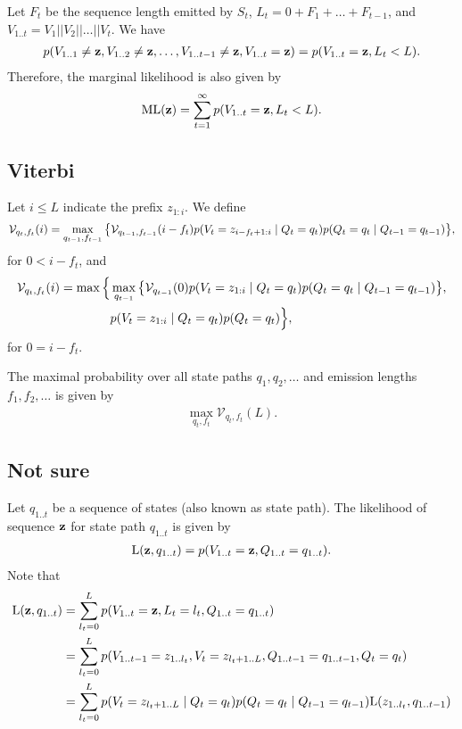 Let $F_t$ be the sequence length emitted by $S_t$, $L_t = 0+F_1+\dots+F_{t-1}$,
and $V_{1..t} = V_1||V_2||\dots||V_t$.
We have
\begin{align*}
  p(V_{1..1} \neq \mathbf{z}, V_{1..2} \neq \mathbf{z}, \dots, V_{1..{t-1}} \neq \mathbf{z}, V_{1..t}=\mathbf{z})
  = p(V_{1..t}=\mathbf{z}, L_t<L).
\end{align*}
Therefore, the marginal likelihood is also given by
\begin{align*}
  \mathrm{ML}(\mathbf{z}) = \sum_{t=1}^{\infty} p(V_{1..t}=\mathbf{z}, L_t<L).
\end{align*}

\subsection{Viterbi}

Let $i \leq L$ indicate the prefix $z_{1:i}$.
We define
\begin{align*}
  \mathcal{V}_{q_t,f_t}(i) =
  \max_{q_{t-1}, f_{t-1}}
  \big\{
    \mathcal{V}_{q_{t-1},f_{t-1}}(i-f_t) p(V_t=z_{i-f_t+1:i} \;|\; Q_t=q_t) p(Q_t=q_t \;|\;
    Q_{t-1}=q_{t-1})
  \big\},
\end{align*}
for $0 < i - f_t$,
and
\begin{align*}
  \mathcal{V}_{q_t,f_t}(i) =
  \max
  \Big\{
    &\max_{q_{t-1}}
    \big\{
      \mathcal{V}_{q_{t-1}}(0) p(V_t=z_{1:i} \;|\; Q_t=q_t) p(Q_t=q_t \;|\;
      Q_{t-1}=q_{t-1})
    \big\},\\
    &p(V_t=z_{1:i} \;|\; Q_t=q_t) p(Q_t=q_t)
  \Big\},
\end{align*}
for $0 = i - f_t$.

The maximal probability over all state paths $q_1, q_2, \dots$ and emission lengths $f_1, f_2,
\dots$ is given by
\begin{align*}
  \max_{q_t, f_t}\mathcal{V}_{q_t,f_t}(L).
\end{align*}

\subsection{Not sure}

Let $q_{1..t}$ be a sequence of states (also known as state path).
The likelihood of sequence $\mathbf{z}$ for state path $q_{1..t}$ is given by
\begin{align*}
  \mathrm{L}(\mathbf{z}, q_{1..t}) = p(V_{1..t}=\mathbf{z}, Q_{1..t}=q_{1..t}).
\end{align*}
Note that
\begin{align*}
  \mathrm{L}(\mathbf{z}, q_{1..t}) &= \sum_{l_t=0}^L p(V_{1..t}=\mathbf{z}, L_t=l_t,
  Q_{1..t}=q_{1..t})\\
  &= \sum_{l_t=0}^L p(V_{1..t-1}=z_{1..l_t}, V_t=z_{l_t+1..L}, Q_{1..t-1}=q_{1..t-1}, Q_t=q_t)\\
  &= \sum_{l_t=0}^L p(V_t=z_{l_t+1..L} \;|\; Q_t=q_t) p(Q_t=q_t \;|\; Q_{t-1}=q_{t-1})
  \mathrm{L}(z_{1..l_t}, q_{1..t-1})
\end{align*}

